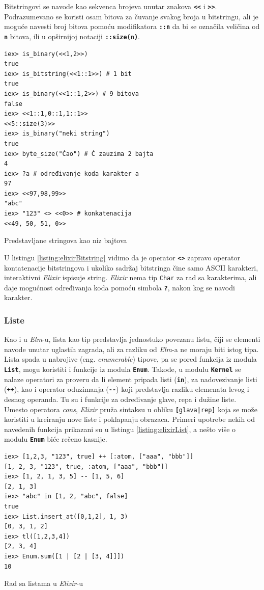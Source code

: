 \documentclass[12pt,oneside]{memoir}
\begin{document}
Bitstringovi se navode kao sekvenca brojeva unutar znakova
\texttt{\textbf{<\smallskip<}} i \texttt{\textbf{>\smallskip>}}. Podrazumevano se koristi
osam bitova za čuvanje svakog broja u bitstringu, ali je moguće navesti broj bitova pomoću
modifikatora \texttt{\textbf{::n}} da bi se označila veličina od \texttt{\textbf{n}} bitova,
ili u opširnijoj notaciji \texttt{\textbf{::size(n)}}.
\begin{listing}[!h]
\begin{verbatim}
iex> is_binary(<<1,2>>)
true
iex> is_bitstring(<<1::1>>) # 1 bit
true
iex> is_binary(<<1::1,2>>) # 9 bitova
false
iex> <<1::1,0::1,1::1>>
<<5::size(3)>>
iex> is_binary("neki string")
true
iex> byte_size("Ćao") # Ć zauzima 2 bajta
4
iex> ?a # određivanje koda karakter a
97
iex> <<97,98,99>>  
"abc"
iex> "123" <> <<0>> # konkatenacija
<<49, 50, 51, 0>>
\end{verbatim}
\caption{Predstavljane stringova kao niz bajtova}
\label{listing:elixirBitstring}
\end{listing}
U listingu \ref{listing:elixirBitstring} vidimo da je operator \texttt{\textbf{<>}} zapravo
operator kontatenacije bitstringova i ukoliko sadržaj bitstringa čine samo ASCII
karakteri, interaktivni \emph{Elixir} ispisuje string. \emph{Elixir} nema tip \texttt{Char} za rad sa
karakterima, ali daje mogućnost određivanja koda pomoću simbola \texttt{\textbf{?}}, nakon 
kog se navodi karakter. 

\subsubsection{Liste}
Kao i u \emph{Elm}-u, lista kao tip predstavlja jednostuko povezanu listu, čiji se elementi navode
unutar uglastih zagrada, ali za razliku od \emph{Elm}-a ne moraju biti istog tipa. Lista spada u 
nabrojive (eng. \emph{enumerable}) tipove, pa se pored funkcija iz modula \texttt{\textbf{List}},
mogu koristiti i funkcije iz modula \texttt{\textbf{Enum}}. Takođe, u modulu \texttt{\textbf{Kernel}}
se nalaze operatori za proveru da li element pripada listi (\texttt{\textbf{in}}), za nadovezivanje
listi (\texttt{\textbf{++}}), kao i operator oduzimanja (\texttt{\textbf{-{}-}}) koji predstavlja
razliku elemenata levog i desnog operanda. Tu su i funkcije za određivanje
glave, repa i dužine liste. Umesto operatora \emph{cons}, \emph{Elixir} pruža sintaksu u obliku
\texttt{\textbf{[}glava\textbf{|}rep\textbf{]}} koja se može koristiti u kreiranju nove
liste i poklapanju obrazaca. Primeri upotrebe nekih od navedenih funkcija prikazani su u
listingu \ref{listing:elixirList}, a nešto više o modulu \texttt{\textbf{Enum}} biće rečeno kasnije. 
\begin{listing}[h]
\begin{verbatim}
iex> [1,2,3, "123", true] ++ [:atom, ["aaa", "bbb"]]
[1, 2, 3, "123", true, :atom, ["aaa", "bbb"]]
iex> [1, 2, 1, 3, 5] -- [1, 5, 6]
[2, 1, 3]
iex> "abc" in [1, 2, "abc", false]
true
iex> List.insert_at([0,1,2], 1, 3)
[0, 3, 1, 2]
iex> tl([1,2,3,4])
[2, 3, 4]
iex> Enum.sum([1 | [2 | [3, 4]]])
10
\end{verbatim}
\caption{Rad sa listama u \emph{Elixir}-u}
\label{listing:elixirList}
\end{listing}
\end{document}

